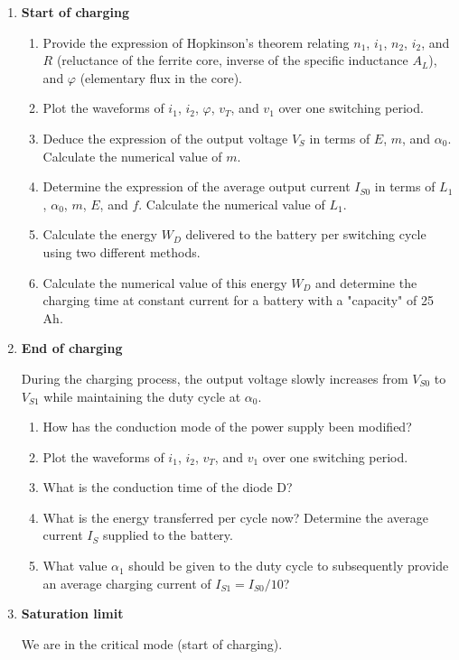\begin{enumerate}

\item \textbf{Start of charging}
\begin{enumerate}
\item Provide the expression of Hopkinson's theorem relating $n_1$, $i_1$, $n_2$, $i_2$, and $R$ (reluctance of the ferrite core, inverse of the specific inductance $A_L$), and $\varphi$ (elementary flux in the core).
\item Plot the waveforms of $i_1$, $i_2$, $\varphi$, $v_T$, and $v_1$ over one switching period.
\item Deduce the expression of the output voltage $V_S$ in terms of $E$, $m$, and $\alpha_0$. Calculate the numerical value of $m$.
\item Determine the expression of the average output current $I_{S0}$ in terms of $L_1$, $\alpha_0$, $m$, $E$, and $f$. Calculate the numerical value of $L_1$.
\item Calculate the energy $W_D$ delivered to the battery per switching cycle using two different methods.
\item Calculate the numerical value of this energy $W_D$ and determine the charging time at constant current for a battery with a "capacity" of 25 Ah.
\end{enumerate}
\item \textbf{End of charging}

During the charging process, the output voltage slowly increases from $V_{S0}$ to $V_{S1}$ while maintaining the duty cycle at $\alpha_0$.
\begin{enumerate}
\item How has the conduction mode of the power supply been modified?
\item Plot the waveforms of $i_1$, $i_2$, $v_T$, and $v_1$ over one switching period.
\item What is the conduction time of the diode D?
\item What is the energy transferred per cycle now? Determine the average current $I_S$ supplied to the battery.
\item What value $\alpha_1$ should be given to the duty cycle to subsequently provide an average charging current of $I_{S1} = I_{S0}/10$?
\end{enumerate}

\item \textbf{Saturation limit}

We are in the critical mode (start of charging).


\end{enumerate}
